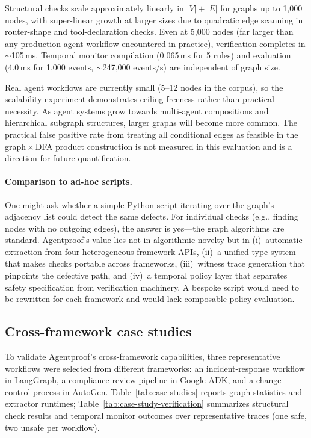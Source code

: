 Structural checks scale approximately linearly in $|V| + |E|$ for
graphs up to 1{,}000 nodes, with super-linear growth at larger sizes
due to quadratic edge scanning in router-shape and tool-declaration
checks. Even at 5{,}000 nodes (far larger than any production agent
workflow encountered in practice), verification completes in $\sim$105\,ms.
Temporal monitor compilation (0.065\,ms for 5 rules) and evaluation
(4.0\,ms for 1{,}000 events, $\sim$247{,}000 events/s) are independent
of graph size.

Real agent workflows are currently small (5--12 nodes in
the corpus), so the scalability experiment demonstrates
ceiling-freeness rather than practical necessity. As agent systems grow
towards multi-agent compositions and hierarchical subgraph
structures, larger graphs will become more common.
The practical false positive rate from treating all conditional edges as
feasible in the graph\,$\times$\,DFA product construction is not
measured in this evaluation and is a direction for future
quantification.

\paragraph{Comparison to ad-hoc scripts.}
One might ask whether a simple Python script iterating over the graph's
adjacency list could detect the same defects. For individual checks
(e.g., finding nodes with no outgoing edges), the answer is
yes---the graph algorithms are standard. Agentproof's value lies not in
algorithmic novelty but in (i)~automatic extraction from four
heterogeneous framework APIs, (ii)~a unified type system that makes
checks portable across frameworks, (iii)~witness trace generation that
pinpoints the defective path, and (iv)~a temporal policy layer that
separates safety specification from verification machinery. A bespoke
script would need to be rewritten for each framework and would lack
composable policy evaluation.

\subsection{Cross-framework case studies}
\label{sec:case_studies}

To validate Agentproof's cross-framework capabilities, three representative
workflows were selected from different frameworks: an incident-response
workflow in LangGraph, a compliance-review pipeline in Google ADK, and a
change-control process in AutoGen. Table~\ref{tab:case-studies} reports
graph statistics and extractor runtimes; Table~\ref{tab:case-study-verification}
summarizes structural check results and temporal monitor outcomes over
representative traces (one safe, two unsafe per workflow).


